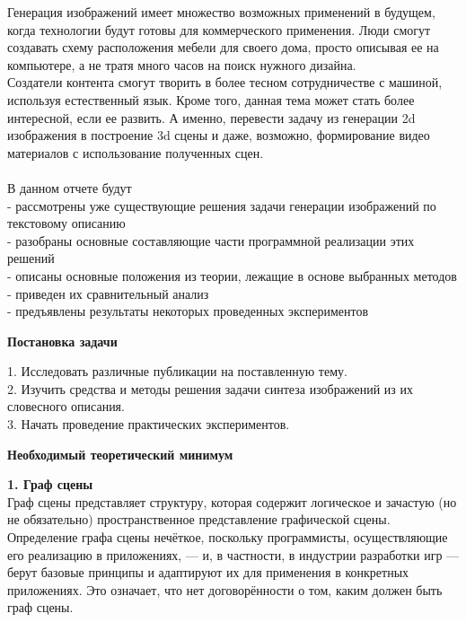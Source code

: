 \documentclass{article}
\begin{document}
    Генерация изображений имеет множество возможных применений в
    будущем, когда технологии будут готовы для коммерческого применения. 
    Люди смогут создавать схему расположения мебели для своего дома, просто описывая ее на компьютере, а не тратя много часов на поиск нужного дизайна.\\ 
    Создатели контента смогут творить в более тесном сотрудничестве с машиной, используя естественный язык.
    Кроме того, данная тема может стать более интересной, если ее развить. А именно, перевести задачу из генерации 2d изображения в построение 3d сцены и даже, возможно, формирование видео материалов с использование полученных сцен.\\ \\
    В данном отчете будут \\
    - рассмотрены уже существующие решения задачи генерации изображений по текстовому описанию\\
    - разобраны основные составляющие части программной реализации этих решений\\
    - описаны основные положения из теории, лежащие в основе выбранных методов\\
    - приведен их сравнительный анализ\\
    - предъявлены результаты некоторых проведенных экспериментов\\
    \newpage
    \begin{center} 
    \huge \textbf{Постановка задачи} \\[1.3cm]
    \end{center} 
      \large 1. Исследовать различные публикации на поставленную тему.\\
             2. Изучить средства и методы решения задачи синтеза изображений из их словесного описания.\\
             3. Начать проведение практических экспериментов.\\
    \newpage
    \begin{center} 
    \huge \textbf{Необходимый теоретический минимум} \\[1.3cm]
    \end{center} 
      \large \textbf{1. Граф сцены}\\
      Граф сцены представляет структуру, которая содержит логическое и зачастую (но не обязательно) пространственное представление графической сцены. Определение графа сцены нечёткое, поскольку программисты, осуществляющие его реализацию в приложениях, — и, в частности, в индустрии разработки игр — берут базовые принципы и адаптируют их для применения в конкретных приложениях. Это означает, что нет договорённости о том, каким должен быть граф сцены.
\end{document}
